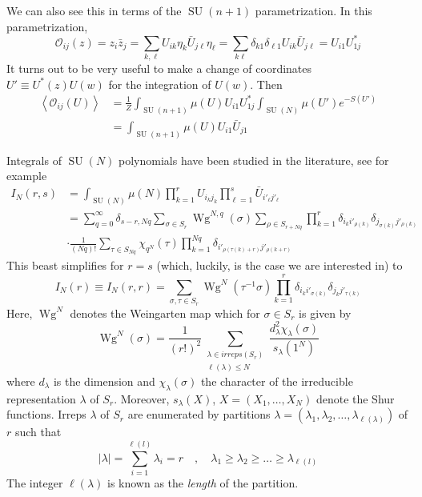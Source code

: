 \documentclass[a4paper,11pt]{article}
\theoremstyle{definition}
\DeclareMathOperator{\SU}{SU}
\DeclareMathOperator{\Wg}{Wg}
\newcommand{\OO}{\mathcal O}
\begin{document}
We can also see this in terms of the $\SU(n+1)$ parametrization.
In this parametrization, 
\begin{equation}
  \OO_{ij}(z) = z_i \bar z_j = \sum_{k,\ell} U_{ik} \eta_k \bar U_{j\ell} \eta_{\ell} = \sum_{k\ell} \delta_{k 1}\delta_{\ell 1} U_{ik}\bar U_{j\ell} = U_{i1}U^*_{1j}
\end{equation}
It turns out to be very useful to make a change of coordinates $U' \equiv U^*(z)U(w)$ for the integration of $U(w)$.
Then
\begin{equation}
  \begin{split} 
    \left\langle \OO_{ij}(U) \right\rangle &= \frac{1}{Z} \int_{\SU(n+1)}\mu(U) U_{i1}U^*_{1j} \int_{\SU(N)} \mu(U') e^{-S(U')} \\
    &= \int_{\SU(n+1)}\mu(U) U_{i1}\bar U_{j1}
  \end{split}
  \label{eq:toy_one_pt_from_SU}
\end{equation}

Integrals of $\SU(N)$ polynomials have been studied in the literature, see for example \cite{Borisenko_Voloshyn_Chelnokov,Collins}
\begin{equation}
  \begin{split} 
    I_N(r,s) &= \int_{\SU(N)} \mu(N) \prod_{k=1}^r U_{i_kj_k} \prod_{\ell = 1}^s \bar U_{i'_{\ell} j'_{\ell}} \\
    &= \sum_{q = 0}^{\infty} \delta_{s-r, Nq}\sum_{\sigma \in S_r} \Wg^{N,q}(\sigma)\sum_{\rho\in S_{r+ Nq}}\prod_{k=1}^r \delta_{i_ki'_{\rho(k)}}\delta_{j_{\sigma(k)}j'_{\rho(k)}}\\
    &\cdot \frac{1}{(Nq)!} \sum_{\tau \in S_{Nq}} \chi_{q^N}(\tau) \prod_{k=1}^{Nq} \delta_{i'_{\rho(\tau(k) + r)}j'_{\rho(k + r)}}
  \end{split}
\end{equation}
This beast simplifies for $r = s$ (which, luckily, is the case we are interested in) to 
\begin{equation}
  I_N(r) \equiv I_N(r,r) = \sum_{\sigma,\tau \in S_r} \Wg^N(\tau^{-1}\sigma)\prod_{k=1}^r\delta_{i_ki'_{\sigma(k)}}\delta_{j_kj'_{\tau(k)}}
  \label{eq:SUN_poly_int}
\end{equation}
Here, $\Wg^N$ denotes the Weingarten map which for $\sigma \in S_r$ is given by
\begin{equation}
  \Wg^{N}(\sigma) = \frac{1}{(r!)^2} \sum_{\substack{\lambda \in irreps(S_r) \\ \ell(\lambda) \leq N}} \frac{d^2_{\lambda}\chi_{\lambda}(\sigma)}{s_{\lambda}(1^N)}
\end{equation}
where $d_{\lambda}$ is the dimension and $\chi_{\lambda}(\sigma)$ the character of the irreducible representation $\lambda$ of $S_r$.
Moreover, $s_{\lambda}(X)$, $X = (X_1,\dots,X_N)$ denote the Shur functions.
Irreps $\lambda$ of $S_r$ are enumerated by partitions $\lambda = (\lambda_1,\lambda_2,\dots,\lambda_{\ell(\lambda)})$ of $r$ such that 
\begin{equation}
  \lvert\lambda\rvert = \sum_{i=1}^{\ell(l)} \lambda_i = r \quad , \quad \lambda_1 \geq \lambda_2 \geq \dots \geq \lambda_{\ell(l)}
\end{equation}
The integer $\ell(\lambda)$ is known as the \emph{length} of the partition.
\end{document}
